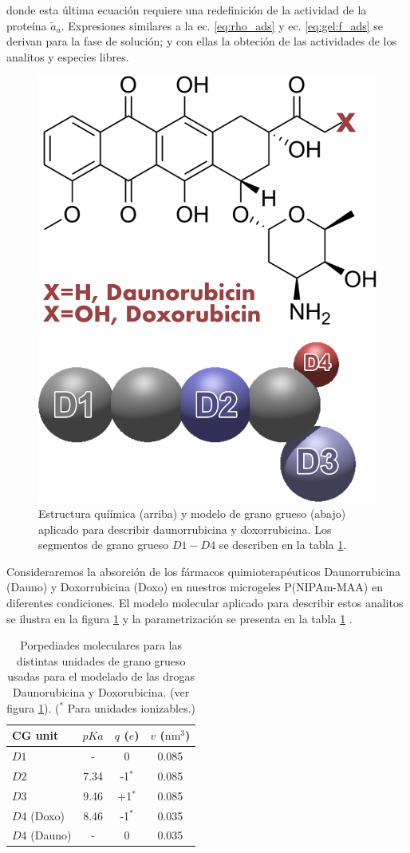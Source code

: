 \noindent donde esta \'ultima ecuaci\'on requiere una redefinici\'on de la actividad de la prote\'ina $\tilde{a}_a$.
Expresiones similares a la ec. \ref{eq:rho_ads} y ec. \ref{eq:gel:f_ads} se derivan para la fase de soluci\'on; y con ellas la obteci\'on de las actividades  de los analitos y especies libres. 



\begin{figure}[!tb]
\centering
\includegraphics[width=0.35\linewidth]{Figures/graph-gel/dauno-doxo.png}
\caption{Estructura quí\'imica (arriba) y modelo de grano grueso (abajo) aplicado para describir daunorrubicina y doxorrubicina.
	Los segmentos de grano grueso $D1-D4$ se describen en la tabla \ref{table:gel:drugs}.}
\label{fig:gel:dauno-doxo}
\end{figure}


Consideraremos la absorci\'on de los f\'armacos quimioterap\'euticos Daunorrubicina (Dauno) y Doxorrubicina (Doxo) en nuestros microgeles P(NIPAm-MAA) en diferentes condiciones.
El modelo molecular aplicado para describir estos analitos se ilustra en la figura \ref{fig:gel:dauno-doxo} y la parametrizaci\'on se presenta en la tabla \ref{table:gel:drugs} \cite{PerezChavez2020}.

\begin{table}
\centering
\begin{tabular}{|lccc|}
    \hline
    {CG unit} & {$pKa$} & {$q$ ($e$)} & {$v$ ($\text{nm}^3$)} \\
      \hline
$D1$ & - & 0 & 0.085\\
$D2$ & 7.34 & -1$^\ast$ & 0.085\\
$D3$ & 9.46 & +1$^\ast$ & 0.085\\ 
$D4$ (Doxo) & 8.46 & -1$^\ast$ & 0.035\\
$D4$ (Dauno) & - & 0 & 0.035 \\
    \hline
  \end{tabular}
 \caption{Porpediades moleculares para las distintas unidades de grano grueso usadas para el modelado de las drogas Daunorubicina y Doxorubicina. (ver figura \ref{fig:gel:dauno-doxo}).
\footnotesize ($^\ast$ Para unidades ionizables.)}
\label{table:gel:drugs} 
\end{table}




